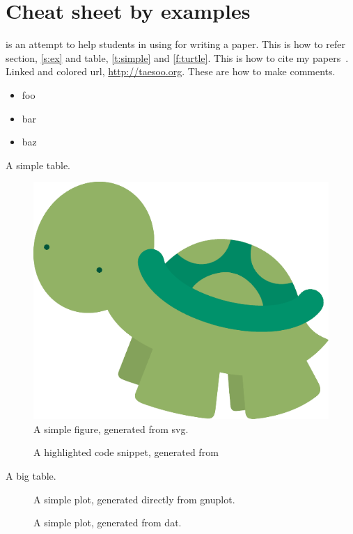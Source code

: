 \section{Cheat sheet by examples}
\label{s:ex}

\sys is an attempt to help students in using \LaTex for writing a
paper.
This is how to refer section, \autoref{s:ex} and table,
\autoref{t:simple} and \autoref{f:turtle}.
This is how to cite my papers~\cite{kim:userfs,kim:poirot}.
Linked and colored url, \url{http://taesoo.org}. 
These are how to make comments.

\begin{itemize}[noitemsep,nolistsep]
 \setlength{\itemsep}{-0pt}
 \item foo
 \item bar
 \item baz
\end{itemize}

\begin{table}[h]
\centering
\footnotesize

\caption{A simple table.}
\label{t:simple}
\end{table}

\begin{figure}[h]
\centering
\footnotesize
\includegraphics[width=0.5\columnwidth]{fig/ex-turtle}
\caption{A simple figure, generated from svg.}
\label{f:turtle}
\end{figure}

\begin{figure}[t]
\centering
\footnotesize

\caption{A highlighted code snippet, generated from 
}
\label{f:code}
\end{figure}

\begin{table}[t]
\centering
\footnotesize

\caption{A big table.}
\label{t:big}
\end{table}

\begin{figure}[T]
\centering
\footnotesize
{}
\caption{A simple plot, generated directly from gnuplot.}
\label{f:gaussian}
\end{figure}

\begin{figure}[T]
\centering
\footnotesize
{}
\caption{A simple plot, generated from dat.}
\label{f:plot}
\end{figure}
